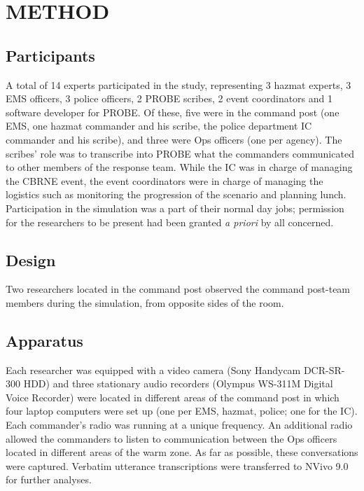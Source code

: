 \documentclass[link]{IWCOMP}
\begin{document}
\section{METHOD}\label{sec3}

\subsection{Participants}\label{subsec3.1}

A total of 14 experts participated in the study, representing 3 hazmat
experts, 3 EMS officers, 3 police officers, 2 PROBE scribes, 2 event
coordinators and 1 software developer for PROBE. Of these, five were in the
command post (one EMS, one hazmat commander and his scribe, the police
department IC commander and his scribe), and three were Ops officers (one
per agency). The scribes' role was to transcribe into PROBE what the
commanders communicated to other members of the response team. While the IC
was in charge of managing the CBRNE event, the event coordinators were in
charge of managing the logistics such as monitoring the progression of the
scenario and planning lunch. Participation in the simulation was a part of
their normal day jobs; permission for the researchers to be present had been
granted \textit{a priori} by all concerned.\vspace*{-3pt}

\subsection{Design}\label{subsec3.2}

Two researchers located in the command post observed the command post-team
members during the simulation, from opposite sides of the room.

\subsection{Apparatus}\label{subsec3.3}

Each researcher was equipped with a video camera (Sony Handycam DCR-SR-300
HDD) and three stationary audio recorders (Olympus WS-311M Digital Voice
Recorder) were located in different areas of the command post in which four
laptop computers were set up (one per EMS, hazmat, police; one for the IC).
Each commander's radio was running at a unique frequency. An additional
radio allowed the commanders to listen to communication between the Ops
officers located in different areas of the warm zone. As far as possible,
these conversations were captured. Verbatim utterance transcriptions were
transferred to NVivo 9.0 for further analyses.
\end{document}
